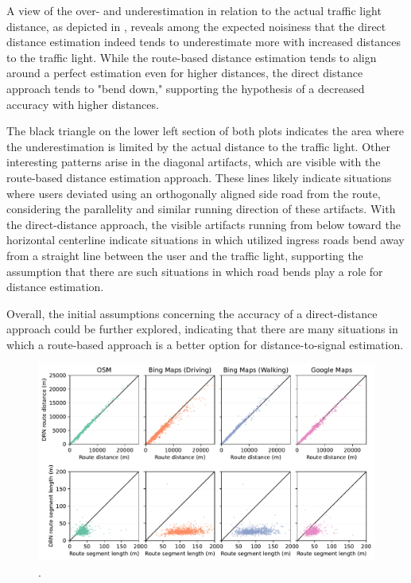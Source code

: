 A view of the over- and underestimation in relation to the actual traffic light distance, as depicted in , reveals among the expected noisiness that the direct distance estimation indeed tends to underestimate more with increased distances to the traffic light. While the route-based distance estimation tends to align around a perfect estimation even for higher distances, the direct distance approach tends to "bend down," supporting the hypothesis of a decreased accuracy with higher distances. 

The black triangle on the lower left section of both plots indicates the area where the underestimation is limited by the actual distance to the traffic light. Other interesting patterns arise in the diagonal artifacts, which are visible with the route-based distance estimation approach. These lines likely indicate situations where users deviated using an orthogonally aligned side road from the route, considering the parallelity and similar running direction of these artifacts. With the direct-distance approach, the visible artifacts running from below toward the horizontal centerline indicate situations in which utilized ingress roads bend away from a straight line between the user and the traffic light, supporting the assumption that there are such situations in which road bends play a role for distance estimation.

Overall, the initial assumptions concerning the accuracy of a direct-distance approach could be further explored, indicating that there are many situations in which a route-based approach is a better option for distance-to-signal estimation.

\begin{figure}[t]
\centering 
\includegraphics[width=\linewidth]{images/routing-distance-comparison.pdf}
\caption{.}
\label{fig:routing-distance-comparison}
\end{figure}

